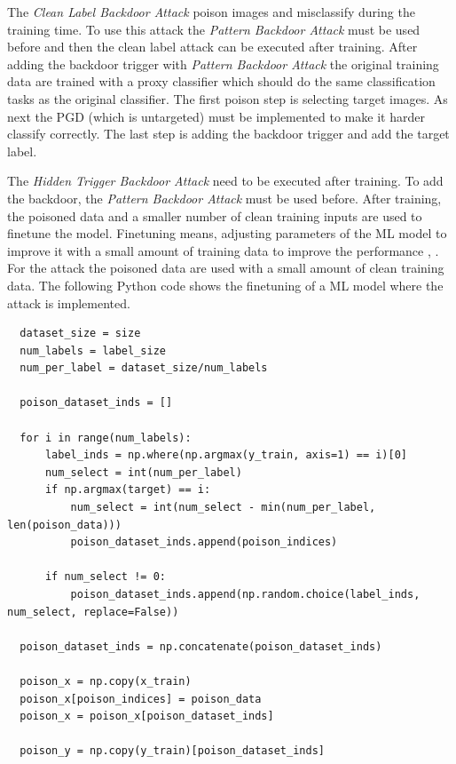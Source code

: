 The \textit{Clean Label Backdoor Attack} \cite{turner2018clean} poison images and misclassify during the training time. To use this attack the \textit{Pattern Backdoor Attack} must be
used before and then the clean label attack can be executed after training. After adding the backdoor trigger with \textit{Pattern Backdoor Attack} the original training data are trained
with a proxy classifier which should do the same classification tasks as the original classifier. The first poison step is selecting target images. As next the PGD (which is untargeted)
must be implemented to make it harder classify correctly. The last step is adding the backdoor trigger and add the target label.

The \textit{Hidden Trigger Backdoor Attack} \cite{DBLP:journals/corr/abs-1910-00033} need to be executed after training. To add the backdoor, the \textit{Pattern Backdoor Attack} must be
used before. After training, the poisoned data and a smaller number of clean training inputs are used to finetune the model. Finetuning means, adjusting parameters of the ML model to
improve it with a small amount of training data to improve the performance \cite{DBLP:conf/acl/LiWTTTPBCA20}, \cite{DBLP:journals/corr/abs-2112-08691}. For the attack the poisoned data
are used with a small amount of clean training data. The following Python code shows the finetuning of a ML model where the attack is implemented.

\begin{lstlisting}
  dataset_size = size
  num_labels = label_size
  num_per_label = dataset_size/num_labels

  poison_dataset_inds = []

  for i in range(num_labels):
      label_inds = np.where(np.argmax(y_train, axis=1) == i)[0]
      num_select = int(num_per_label)
      if np.argmax(target) == i:
          num_select = int(num_select - min(num_per_label, len(poison_data)))
          poison_dataset_inds.append(poison_indices)

      if num_select != 0:
          poison_dataset_inds.append(np.random.choice(label_inds, num_select, replace=False))

  poison_dataset_inds = np.concatenate(poison_dataset_inds)

  poison_x = np.copy(x_train)
  poison_x[poison_indices] = poison_data
  poison_x = poison_x[poison_dataset_inds]

  poison_y = np.copy(y_train)[poison_dataset_inds]
\end{lstlisting}

